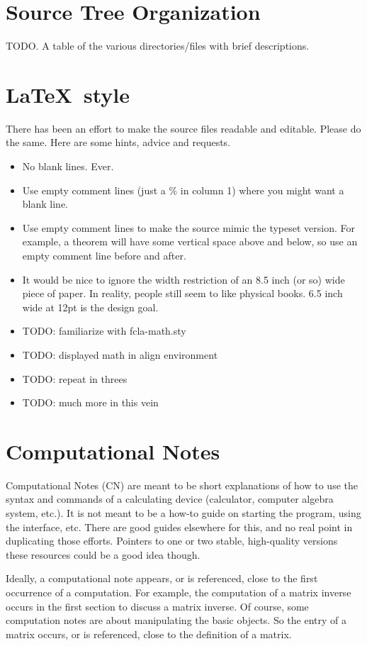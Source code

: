 \documentclass[12pt]{article}
\begin{document}
\section*{Source Tree Organization}
%
TODO.  A table of the various directories/files with brief descriptions.\par
%
\section*{\LaTeX\ style}
%
There has been an effort to make the source files readable and editable.  Please do the same.  Here are some hints, advice and requests.
%
\begin{itemize}
\item No blank lines.  Ever.
\item Use empty comment lines (just a \% in column 1) where you might want a blank line.
\item Use empty comment lines to make the source mimic the typeset version.  For example, a theorem will have some vertical space above and below, so use an empty comment line before and after.
\item It would be nice to ignore the width restriction of an 8.5 inch (or so) wide piece of paper.  In reality, people still seem to like physical books.  6.5 inch wide at 12pt is the design goal.
\item TODO: familiarize with fcla-math.sty
\item TODO: displayed math in align environment
\item TODO: repeat in threes
\item TODO: much more in this vein
\end{itemize}
%
\section*{Computational Notes}
%
Computational Notes (CN) are meant to be short explanations of how to use the syntax and commands of a calculating device (calculator, computer algebra system, etc.).  It is not meant to be a how-to guide on starting the program, using the interface, etc.  There are good guides elsewhere for this, and no real point in duplicating those efforts.  Pointers to one or two stable, high-quality versions these resources could be a good idea though.\par
%
Ideally, a computational note appears, or is referenced, close to the first occurrence of a computation.  For example, the computation of a matrix inverse occurs in the first section to discuss a matrix inverse.  Of course, some computation notes are about manipulating the basic objects.  So the entry of a matrix occurs, or is referenced, close to the definition of a matrix.
%
\end{document}
